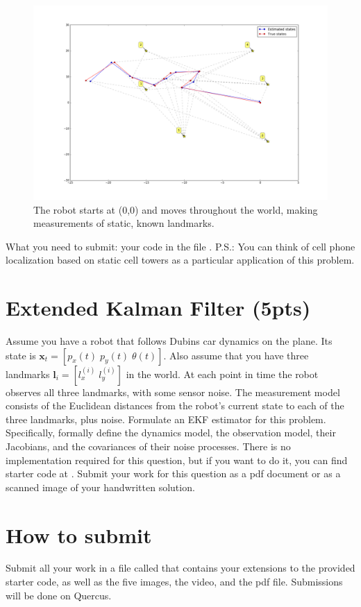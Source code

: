 \documentclass[11pt, a4paper]{article}
\begin{document}
\begin{figure}[h]
  \begin{center}
    \includegraphics[width=\textwidth]{localization}
  \end{center}
  \caption{The robot starts at (0,0) and moves throughout the world, making measurements of static, known landmarks.}
\end{figure}

\noindent What you need to submit: your code in the file .
\newline
\newline
P.S.: You can think of cell phone localization based on static cell towers as a particular application of this problem.

\section{Extended Kalman Filter (5pts)}
Assume you have a robot that follows Dubins car dynamics on the plane. Its state is $\textbf{x}_t=[p_x(t) \; p_y(t) \; \theta(t)]$. Also assume that you have
three landmarks $\textbf{l}_i=[l_x^{(i)} \; l_y^{(i)}]$ in the world. At each point in time the robot observes all three landmarks, with some sensor noise.
The measurement model consists of the Euclidean distances from the robot's current state to each of the three landmarks, plus noise. Formulate an EKF estimator for this problem.
Specifically, formally define the dynamics model, the observation model, their Jacobians, and the covariances of their noise processes. There is no implementation
required for this question, but if you want to do it, you can find starter code at . Submit your work for this question as a pdf document or as a scanned image of your handwritten solution.

\section{How to submit}
Submit all your work in a file called  that contains your extensions to the provided starter code, as well as the five images, the video, and the pdf file.
Submissions will be done on Quercus.

\end{document}
